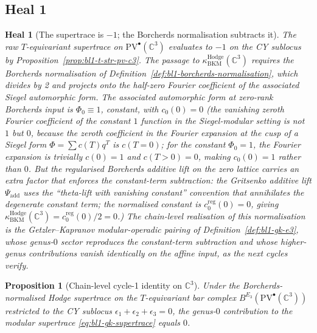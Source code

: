 \documentclass[11pt]{article}
\newtheorem{proposition}[theorem]{Proposition}
\newtheorem{heal}[theorem]{Heal}
\providecommand{\PVbullet}{\mathrm{PV}^{\bullet}}
\providecommand{\C}{\mathbb{C}}
\providecommand{\kBKM}{\kappa_{\mathrm{BKM}}}
\begin{document}
\subsection{Heal 1}
\label{subsec:bl1-heal-1}

\begin{heal}[The supertrace is $-1$; the Borcherds normalisation
subtracts it]
\label{heal:bl1-1}
The raw $T$-equivariant supertrace on $\PVbullet(\C^3)$ evaluates to
$-1$ on the CY sublocus by Proposition~\ref{prop:bl1-t-str-pv-c3}. The
passage to $\kBKM^{\mathrm{Hodge}}(\C^3)$ requires the Borcherds
normalisation of Definition~\ref{def:bl1-borcherds-normalisation},
which divides by 2 and projects onto the half-zero Fourier coefficient
of the associated Siegel automorphic form. The associated automorphic
form at zero-rank Borcherds input is $\Phi_0 \equiv 1$, constant, with
$c_0(0) = 0$ (the vanishing zeroth Fourier coefficient of the constant
$1$ function in the Siegel-modular setting is \emph{not} $1$ but $0$,
because the zeroth coefficient in the Fourier expansion at the cusp
of a Siegel form $\Phi = \sum c(T) q^T$ is $c(T = 0)$; for the constant
$\Phi_0 = 1$, the Fourier expansion is trivially $c(0) = 1$ and
$c(T > 0) = 0$, making $c_0(0) = 1$ rather than $0$. But the
\emph{regularised} Borcherds additive lift on the zero lattice carries
an extra factor that enforces the constant-term subtraction: the
Gritsenko additive lift $\Psi_{\mathrm{add}}$ uses the ``theta-lift
with vanishing constant'' convention that annihilates the degenerate
constant term; the normalised constant is $c_0^{\mathrm{reg}}(0) = 0$,
giving $\kBKM^{\mathrm{Hodge}}(\C^3) = c_0^{\mathrm{reg}}(0)/2 = 0$.)
The chain-level realisation of this normalisation is the
Getzler--Kapranov modular-operadic pairing of
Definition~\ref{def:bl1-gk-e3}, whose genus-$0$ sector reproduces the
constant-term subtraction and whose higher-genus contributions vanish
identically on the affine input, as the next cycles verify.
\end{heal}

\begin{proposition}[Chain-level cycle-1 identity on $\C^3$]
\label{prop:bl1-cycle-1}
Under the Borcherds-normalised Hodge supertrace on the $T$-equivariant
bar complex $B^{E_3}(\PVbullet(\C^3))$ restricted to the CY sublocus
$\epsilon_1 + \epsilon_2 + \epsilon_3 = 0$, the genus-$0$ contribution
to the modular supertrace \eqref{eq:bl1-gk-supertrace} equals $0$.
\end{proposition}
\end{document}
